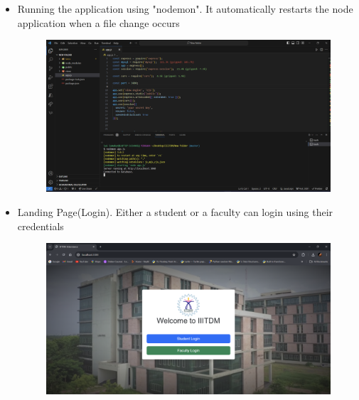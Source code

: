 \documentclass{article}
\begin{document}
\begin{itemize}
    \item \thispagestyle{empty}
    {\large{Running the application using "nodemon". It automatically restarts the node 
    application when a file change occurs}}
    \begin{figure}[H]
        \centering
        \includegraphics[width=1.1\textwidth, center]{11}
    \end{figure}

    \vspace*{2cm}

    \item \thispagestyle{empty}
    {\large{Landing Page(Login). Either a student or a faculty can login 
    using their credentials}}
    \begin{figure}[H]
        \centering
        \includegraphics[width=1.1\textwidth, center]{12}
    \end{figure}

    \newpage


\end{itemize}
\end{document}
